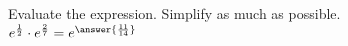 \documentclass{ximera}
\author{David Kish}
\begin{document}
\begin{exercise}
Evaluate the expression. Simplify as much as possible.\\
$e^{\frac{1}{2}}\cdot e^{\frac{2}{7}}=e^{\answer{\frac{11}{14}}}$
\end{exercise}
\end{document}
